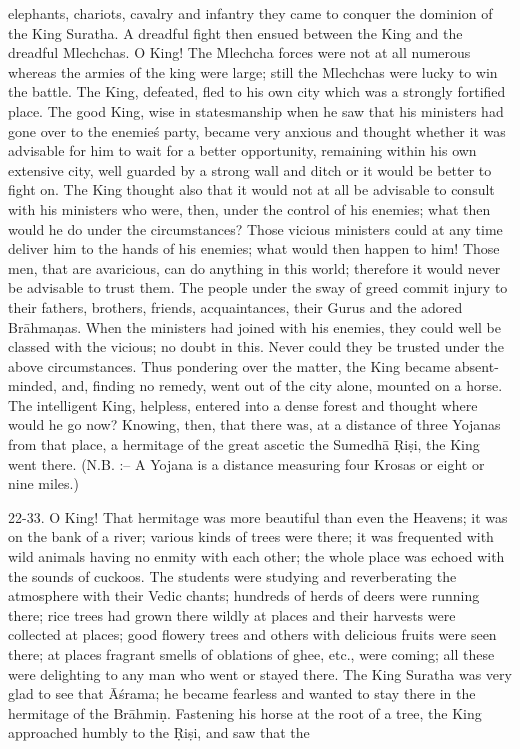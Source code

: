 elephants, chariots, cavalry and infantry they came to conquer the dominion of the King Suratha. A dreadful fight then ensued between the King and the dreadful Mlechchas. O King! The Mlechcha forces were not at all numerous whereas the armies of the king were large; still the Mlechchas were lucky to win the battle. The King, defeated, fled to his own city which was a strongly fortified place. The good King, wise in statesmanship when he saw that his ministers had gone over to the enemie\'s party, became very anxious and thought whether it was advisable for him to wait for a better opportunity, remaining within his own extensive city, well guarded by a strong wall and ditch or it would be better to fight on. The King thought also that it would not at all be advisable to consult with his ministers who were, then, under the control of his enemies; what then would he do under the circumstances? Those vicious ministers could at any time deliver him to the hands of his enemies; what would then happen to him! Those men, that are avaricious, can do anything in this world; therefore it would never be advisable to trust them. The people under the sway of greed commit injury to their fathers, brothers, friends, acquaintances, their Gurus and the adored Br\=ahma\d{n}as. When the ministers had joined with his enemies, they could well be classed with the vicious; no doubt in this. Never could they be trusted under the above circumstances. Thus pondering over the matter, the King became absent-minded, and, finding no remedy, went out of the city alone, mounted on a horse. The intelligent King, helpless, entered into a dense forest and thought where would he go now? Knowing, then, that there was, at a distance of three Yojanas from that place, a hermitage of the great ascetic the Sumedh\=a \d{R}i\d{s}i, the King went there. (N.B. :-- A Yojana is a distance measuring four Krosas or eight or nine miles.)

22-33. O King! That hermitage was more beautiful than even the Heavens; it was on the bank of a river; various kinds of trees were there; it was frequented with wild animals having no enmity with each other; the whole place was echoed with the sounds of cuckoos. The students were studying and reverberating the atmosphere with their Vedic chants; hundreds of herds of deers were running there; rice trees had grown there wildly at places and their harvests were collected at places; good flowery trees and others with delicious fruits were seen there; at places fragrant smells of oblations of ghee, etc., were coming; all these were delighting to any man who went or stayed there. The King Suratha was very glad to see that \=A\'srama; he became fearless and wanted to stay there in the hermitage of the Br\=ahmi\d{n}. Fastening his horse at the root of a tree, the King approached humbly to the \d{R}i\d{s}i, and saw that the

